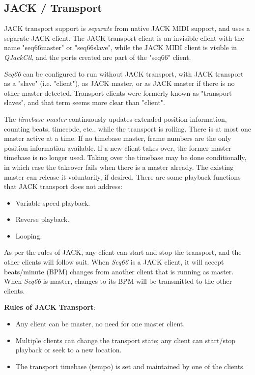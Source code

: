 \subsection{JACK / Transport}
\label{subsec:jack_transport}

   JACK transport support is \textsl{separate} from native JACK MIDI support,
   and uses a separate JACK client.
   The JACK transport client is an invisible client with the
   name "seq66master" or "seq66slave", while the JACK MIDI client is visible in
   \textsl{QJackCtl}, and the ports created are part of the
   "seq66" client.

   \textsl{Seq66} can be configured to run without JACK transport, with JACK
   transport as a "slave" (i.e. "client"), as JACK master, or as JACK master if
   there is no other master detected.
   Transport clients were formerly known as "transport slaves", and that
   term seems more clear than "client".

   The \textsl{timebase master}
   continuously updates extended position information, counting beats,
   timecode, etc., while the transport is rolling.
   There is at most one master active at a time. If no
   timebase master, frame numbers are the only position information available.
   If a new client takes over, the former master timebase is no longer used.
   Taking over the timebase may be done conditionally, in which case the takeover
   fails when there is a master already. The existing master can release it
   voluntarily, if desired.
   There are some playback functions that JACK transport does not address:

   \begin{itemize}
      \item Variable speed playback.
      \item Reverse playback.
      \item Looping.
   \end{itemize}

   As per the rules of JACK, any client can start and stop the transport, and
   the other clients will follow suit.  When \textsl{Seq66} is a JACK client,
   it will accept beats/minute (BPM) changes from another client that is
   running as master.  When \textsl{Seq66} is master, changes to its BPM will
   be transmitted to the other clients.

   \textbf{Rules of JACK Transport}:

   \begin{itemize}
      \item Any client can be master, no need for one master client.
      \item Multiple clients can change the transport state;
         any client can start/stop playback or seek to a new location.
      \item The transport timebase (tempo) is set and maintained by
         one of the clients.
   \end{itemize}

